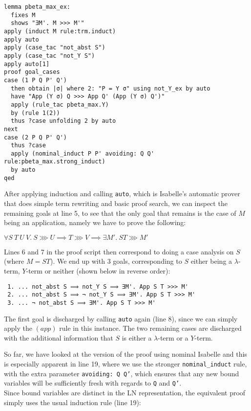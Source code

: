 \documentclass[a4paper, 12pt, twoside]{style/ociamthesis}
\theoremstyle{plain}
\theoremstyle{definition}
\theoremstyle{remark}
\begin{document}
\begin{verbatim}
lemma pbeta_max_ex:
  fixes M
  shows "∃M'. M >>> M'"
apply (induct M rule:trm.induct)
apply auto
apply (case_tac "not_abst S")
apply (case_tac "not_Y S")
apply auto[1]
proof goal_cases
case (1 P Q P' Q')
  then obtain |σ| where 2: "P = Y σ" using not_Y_ex by auto
  have "App (Y σ) Q >>> App Q' (App (Y σ) Q')"
  apply (rule_tac pbeta_max.Y)
  by (rule 1(2))
  thus ?case unfolding 2 by auto
next
case (2 P Q P' Q')
  thus ?case
  apply (nominal_induct P P' avoiding: Q Q' rule:pbeta_max.strong_induct)
  by auto
qed
\end{verbatim}

After applying induction and calling \texttt{auto}, which is Isabelle's
automatic prover that does simple term rewriting and basic proof search,
we can inspect the remaining goals at line 5, to see that the only goal
that remains is the case of \(M\) being an application, namely we have
to prove the following:

\begin{center}
$\forall S\ T\ U\ V.\ S \ggg U \implies T \ggg V \implies \exists M'.\ ST \ggg M'$
\end{center}

Lines 6 and 7 in the proof script then correspond to doing a case
analysis on \(S\) (where \(M = ST\)). We end up with 3 goals,
corresponding to \(S\) either being a \(\lambda\)-term, \(Y\)-term or
neither (shown below in reverse order):

\begin{verbatim}
 1. ... not_abst S ⟹ not_Y S ⟹ ∃M'. App S T >>> M'
 2. ... not_abst S ⟹ ¬ not_Y S ⟹ ∃M'. App S T >>> M'
 3. ... ¬ not_abst S ⟹ ∃M'. App S T >>> M'
\end{verbatim}

The first goal is discharged by calling \texttt{auto} again (line 8),
since we can simply apply the \((app)\) rule in this instance. The two
remaining cases are discharged with the additional information that
\(S\) is either a \(\lambda\)-term or a \(Y\)-term.

So far, we have looked at the version of the proof using nominal
Isabelle and this is especially apparent in line 19, where we use the
stronger \texttt{nominal\_induct} rule, with the extra parameter
\texttt{avoiding: Q Q'}, which ensures that any new bound variables will
be sufficiently fresh with regards to \texttt{Q} and \texttt{Q'}.\\
Since bound variables are distinct in the LN representation, the
equivalent proof simply uses the usual induction rule (line 19):
\end{document}
